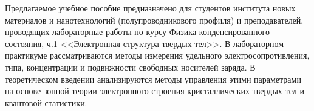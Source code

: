 \begin{introduction}
\newpage


Предлагаемое учебное пособие предназначено для студентов института новых материалов и нанотехнологий (полупроводникового профиля) и преподавателей, проводящих лабораторные работы по курсу Физика конденсированного состояния, ч.1 <<Электронная структура твердых тел>>. В лабораторном практикуме рассматриваются методы измерения удельного электросопротивления, типа, концентрации и подвижности свободных носителей заряда. В теоретическом введении анализируются методы управления этими параметрами на основе зонной теории электронного строения кристаллических твердых тел и квантовой статистики.

\end{introduction}
